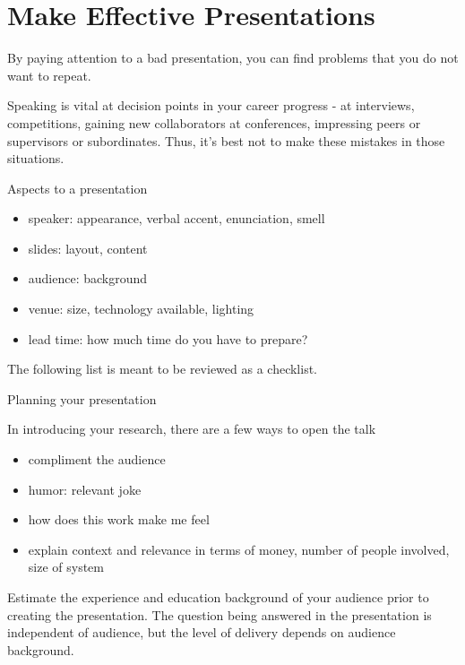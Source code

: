 \section{Make Effective Presentations\label{sec:presentations}}


By paying attention to a bad presentation, you can find problems that you do not want to repeat.

Speaking is vital at decision points in your career progress - at interviews, competitions, gaining new collaborators at conferences, impressing peers or supervisors or subordinates. Thus, it's best not to make these mistakes in those situations.

Aspects to a presentation
\begin{itemize}
    \item speaker: appearance, verbal accent, enunciation, smell
    \item slides: layout, content
    \item audience: background
    \item venue: size, technology available, lighting
    \item lead time: how much time do you have to prepare?
\end{itemize}
The following list is meant to be reviewed as a checklist.

Planning your presentation

In introducing your research, there are a few ways to open the talk
\begin{itemize}
    \item compliment the audience
    \item humor: relevant joke
    \item how does this work make me feel
    \item explain context and relevance in terms of money, number of people involved, size of system
\end{itemize}
Estimate the experience and education background of your audience prior to creating the presentation. The question being answered in the presentation is independent of audience, but the level of delivery depends on audience background.


